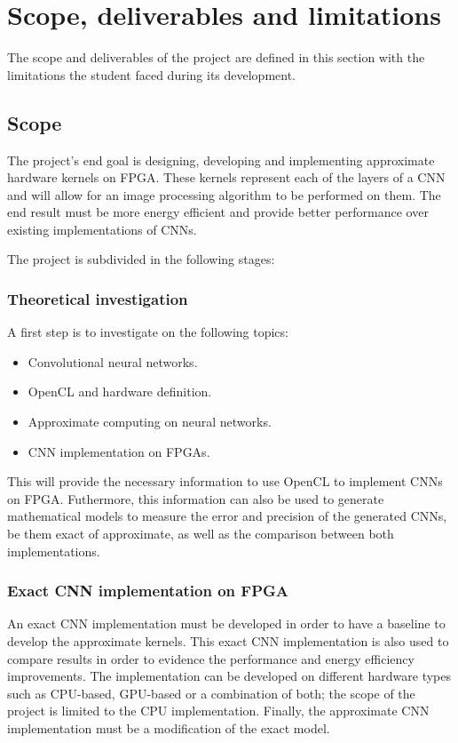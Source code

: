 \section{Scope, deliverables and limitations}

The scope and deliverables of the project
are defined in this section with the limitations the student faced during its development.

\subsection{Scope}

The project's end goal is designing, developing and implementing approximate hardware kernels on FPGA.
These kernels represent each of the layers of a CNN and will allow for an image processing algorithm to be
performed on them. The end result must be more energy efficient and provide better performance over existing
implementations of CNNs.

The project is subdivided in the following stages:

\subsubsection{Theoretical investigation}

A first step is to investigate on the following topics:

\begin{itemize}
    \item Convolutional neural networks.
    \item OpenCL and hardware definition.
    \item Approximate computing on neural networks.
    \item CNN implementation on FPGAs.
\end{itemize}

This will provide the necessary information to use OpenCL to implement CNNs on FPGA.
Futhermore, this information can also be used to generate mathematical models to measure the error
and precision of the generated CNNs, be them exact of approximate, as well as the comparison between
both implementations.

\subsubsection{Exact CNN implementation on FPGA}

An exact CNN implementation must be developed in order to have a baseline
to develop the approximate kernels. This exact CNN implementation is also used to
compare results in order to evidence the performance and energy efficiency improvements.
The implementation can be developed on different hardware types such as
CPU-based, GPU-based or a combination of both; the scope of the project
is limited to the CPU implementation.
Finally, the approximate CNN implementation must be a modification of the exact model.

